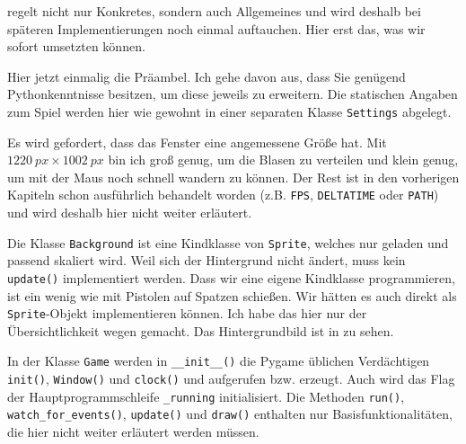  regelt nicht nur Konkretes, sondern auch Allgemeines und wird deshalb bei späteren Implementierungen noch einmal auftauchen. Hier erst das, was wir sofort umsetzten können.

Hier jetzt einmalig die Präambel. Ich gehe davon aus, dass Sie genügend Pythonkenntnisse besitzen, um diese jeweils zu erweitern. Die statischen Angaben zum Spiel werden hier wie gewohnt in einer separaten Klasse \texttt{Settings} abgelegt. 

Es wird gefordert, dass das Fenster eine angemessene Größe hat. Mit $1220~px \times 1002~px$ bin ich groß genug, um die Blasen zu verteilen und klein genug, um mit der Maus noch schnell wandern zu können. Der Rest ist in den vorherigen Kapiteln schon ausführlich behandelt worden (z.B. \texttt{FPS}, \texttt{DELTATIME} oder \texttt{PATH}) und wird deshalb hier nicht weiter erläutert.


\newpage
{}


Die Klasse \texttt{Background} ist eine Kindklasse von \texttt{Sprite}, welches nur geladen und passend skaliert wird. Weil sich der Hintergrund nicht ändert, muss kein \texttt{update()} implementiert werden. Dass wir eine eigene Kindklasse programmieren, ist ein wenig wie mit Pistolen auf Spatzen schießen. Wir hätten es auch direkt als \texttt{Sprite}-Objekt implementieren können. Ich habe das hier nur der Übersichtlichkeit wegen gemacht. Das Hintergrundbild ist in  zu sehen.

\newpage
{}

In der Klasse \texttt{Game} werden in \texttt{\_\_init\_\_()} die Pygame üblichen Verdächtigen \texttt{init()}, \texttt{Window()} und \texttt{clock()} und aufgerufen bzw. erzeugt. Auch wird das Flag der Hauptprogrammschleife \texttt{\_running} initialisiert. Die Methoden \texttt{run()}, \texttt{watch\_for\_events()}, \texttt{update()} und \texttt{draw()} enthalten nur Basisfunktionalitäten, die hier nicht weiter erläutert werden müssen. 

